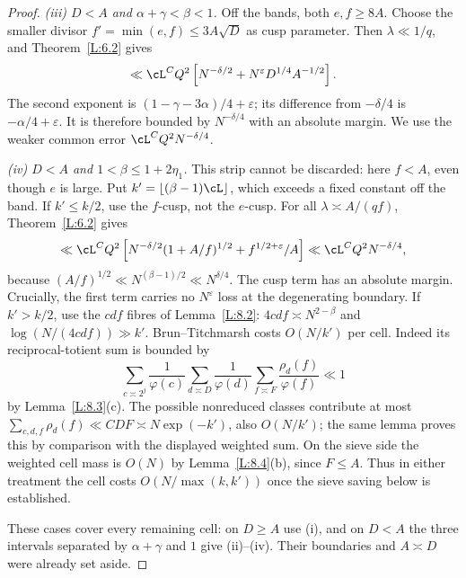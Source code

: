 \begin{proof}
\emph{(iii) $D<A$ and $\alpha+\gamma<\beta<1$.}
Off the bands, both $e,f\geq8A$.  Choose the smaller divisor
$f'=\min(e,f)\leq3A\sqrt D$ as cusp parameter.  Then
$\lambda\ll1/q$, and Theorem~\ref{L:6.2} gives
\[
 \ll\cL^C Q^2
 \left[N^{-\delta/2}+N^\varepsilon D^{1/4}A^{-1/2}\right].
\]
The second exponent is $(1-\gamma-3\alpha)/4+\varepsilon$;
its difference from $-\delta/4$ is $-\alpha/4+\varepsilon$.
It is therefore bounded by $N^{-\delta/4}$ with an absolute margin.
We use the weaker common error $\cL^CQ^2N^{-\delta/4}$.

\emph{(iv) $D<A$ and $1<\beta\leq1+2\eta_1$.}
This strip cannot be discarded: here $f<A$, even though $e$ is large.
Put $k'=\lfloor(\beta-1)\cL\rfloor$, which exceeds a fixed constant
off the band.  If $k'\leq k/2$, use the $f$-cusp, not the $e$-cusp.
For all $\lambda\asymp A/(qf)$, Theorem~\ref{L:6.2} gives
\[
 \ll\cL^CQ^2
 \left[N^{-\delta/2}(1+A/f)^{1/2}+f^{1/2+\varepsilon}/A\right]
 \ll\cL^CQ^2N^{-\delta/4},
\]
because $(A/f)^{1/2}\ll N^{(\beta-1)/2}\ll N^{\delta/4}$.
The cusp term has an absolute margin.  Crucially, the first term
carries no $N^\varepsilon$ loss at the degenerating boundary.
If $k'>k/2$, use the $cdf$ fibres of Lemma~\ref{L:8.2}:
$4cdf\asymp N^{2-\beta}$ and $\log(N/(4cdf))\gg k'$.
Brun--Titchmarsh costs $O(N/k')$ per cell.  Indeed its reciprocal-totient
sum is bounded by
\[
 \sum_{c\asymp2^j}\frac1{\varphi(c)}
 \sum_{d\asymp D}\frac1{\varphi(d)}
 \sum_{f\asymp F}\frac{\rho_d(f)}{\varphi(f)}\ll1
\]
by Lemma~\ref{L:8.3}(c).  The possible nonreduced classes contribute
at most $\sum_{c,d,f}\rho_d(f)\ll CDF\asymp N\exp(-k')$, also
$O(N/k')$; the same lemma proves this by comparison with the displayed
weighted sum.  On the sieve side the weighted cell mass is $O(N)$
by Lemma~\ref{L:8.4}(b), since $F\leq A$.  Thus in either treatment
the cell costs $O(N/\max(k,k'))$ once the sieve saving below is established.

These cases cover every remaining cell: on $D\geq A$ use (i), and on
$D<A$ the three intervals separated by $\alpha+\gamma$ and $1$ give
(ii)--(iv).  Their boundaries and $A\asymp D$ were already set aside.


\end{proof}
